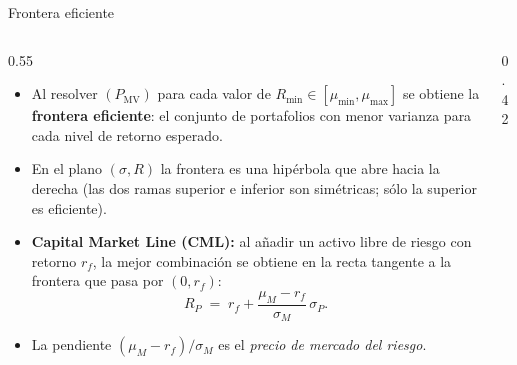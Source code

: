 \documentclass[10pt,aspectratio=169]{beamer}
\newcommand{\y}{\mathbf{y}}
\newcommand{\0}{\mathbf{0}}
\newcommand{\1}{\mathbf{1}}
\begin{document}
\begin{frame}{Frontera eficiente}
  \begin{columns}[T]
    \begin{column}{0.55\textwidth}
      \begin{itemize}
        \item Al resolver $(P_{\mathrm{MV}})$ para cada valor de
              $R_{\min}\in[\mu_{\min},\mu_{\max}]$ se obtiene la
              \textbf{frontera eficiente}: el conjunto de portafolios
              con menor varianza para cada nivel de retorno esperado.
        \item En el plano $(\sigma,R)$ la frontera es una hipérbola
              que abre hacia la derecha (las dos ramas superior e
              inferior son simétricas; sólo la superior es eficiente).
        \item \textbf{Capital Market Line (CML):} al añadir un activo
              libre de riesgo con retorno $r_f$, la mejor combinación
              se obtiene en la recta tangente a la frontera que pasa
              por $(0,r_f)$:
              \[
                R_P \;=\; r_f + \frac{\mu_M - r_f}{\sigma_M}\,\sigma_P.
              \]
        \item La pendiente $(\mu_M-r_f)/\sigma_M$ es el \emph{precio
              de mercado del riesgo}.
      \end{itemize}
    \end{column}
    \begin{column}{0.42\textwidth}
    \end{column}
  \end{columns}
\end{frame}
\end{document}
